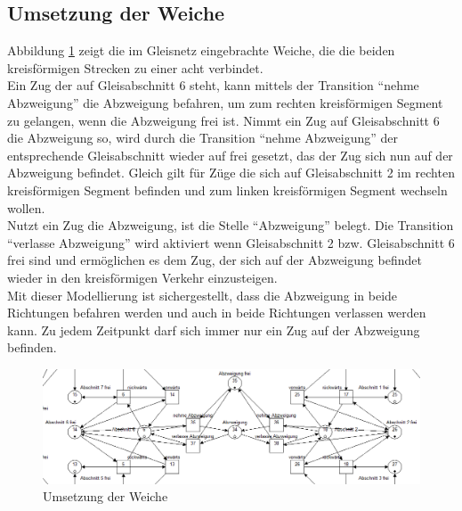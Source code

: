 \documentclass[10pt]{scrartcl}
\begin{document}
\subsection{Umsetzung der Weiche}
Abbildung \ref{fig:Weiche} zeigt die im Gleisnetz eingebrachte Weiche, die die beiden kreisförmigen Strecken zu einer acht verbindet.\\
Ein Zug der auf Gleisabschnitt 6 steht, kann mittels der Transition "`nehme Abzweigung"' die Abzweigung befahren, um zum rechten kreisförmigen Segment zu gelangen, wenn die Abzweigung frei ist. Nimmt ein Zug auf Gleisabschnitt 6 die Abzweigung so, wird durch die Transition "`nehme Abzweigung"' der entsprechende Gleisabschnitt wieder auf frei gesetzt, das der Zug sich nun auf der Abzweigung befindet. Gleich gilt für Züge die sich auf Gleisabschnitt 2 im rechten kreisförmigen Segment befinden  und zum linken kreisförmigen Segment wechseln wollen.\\
Nutzt ein Zug die Abzweigung, ist die Stelle  "`Abzweigung"' belegt. Die Transition  "`verlasse Abzweigung"' wird aktiviert wenn Gleisabschnitt 2 bzw. Gleisabschnitt 6 frei sind und ermöglichen es dem Zug, der sich auf der Abzweigung befindet wieder in den kreisförmigen Verkehr einzusteigen.\\
Mit dieser Modellierung ist sichergestellt, dass die Abzweigung in beide Richtungen befahren werden und auch in beide Richtungen verlassen werden kann. Zu jedem Zeitpunkt darf sich immer nur ein Zug auf der Abzweigung befinden.

\begin{figure}[htbp]
	\centering	\includegraphics[width=1.0\textwidth]{Bilder/Aufgabe2_Weiche.png}
	\caption{Umsetzung der Weiche}
	\label{fig:Weiche}
\end{figure}
\end{document}
